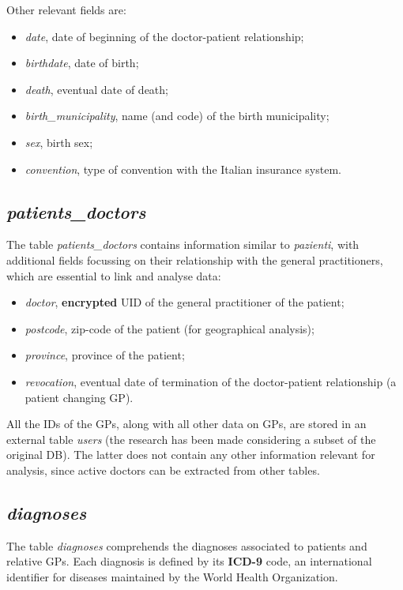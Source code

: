 Other relevant fields are:
\begin{itemize}
	\item \textit{date}, date of beginning of the doctor-patient relationship;
	\item \textit{birthdate}, date of birth;
	\item \textit{death}, eventual date of death;
	\item \textit{birth\_municipality}, name (and code) of the birth municipality;
	\item \textit{sex}, birth sex;
	\item \textit{convention}, type of convention with the Italian insurance system.
\end{itemize}

\subsection{\textit{patients\_doctors}}
The table \textit{patients\_doctors} contains information similar to \textit{pazienti}, with additional fields focussing on their relationship with the general practitioners, which are essential to link and analyse data:
\begin{itemize}
	\item \textit{doctor}, \textbf{encrypted} UID of the general practitioner of the patient;
	\item \textit{postcode}, zip-code of the patient (for geographical analysis);
	\item \textit{province}, province of the patient;
	\item \textit{revocation}, eventual date of termination of the doctor-patient relationship (a patient changing GP).
\end{itemize}

All the IDs of the GPs, along with all other data on GPs, are stored in an external table \textit{users} (the research has been made considering a subset of the original DB). The latter does not contain any other information relevant for analysis, since active doctors can be extracted from other tables.

\subsection{\textit{diagnoses}}
The table \textit{diagnoses} comprehends the diagnoses associated to patients and relative GPs. Each diagnosis is defined by its \textbf{ICD-9} code, an international identifier for diseases maintained by the World Health Organization. 


